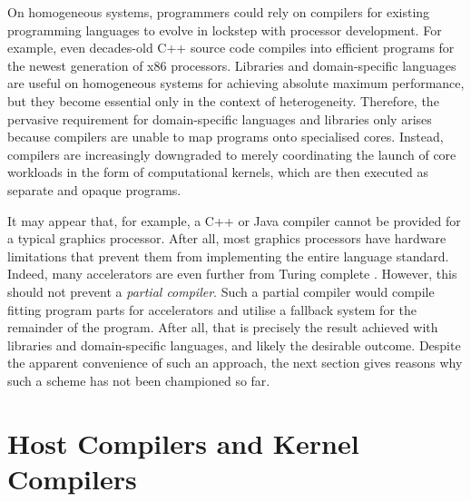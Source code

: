     On homogeneous systems, programmers could rely on compilers for existing
    programming languages to evolve in lockstep with processor development.
    For example, even decades-old C++ source code compiles into efficient
    programs for the newest generation of x86 processors.
    Libraries and domain-specific languages are useful on homogeneous systems
    for achieving absolute maximum performance, but they become essential only
    in the context of heterogeneity.
    Therefore, the pervasive requirement for domain-specific languages and
    libraries only arises because compilers are unable to map programs onto
    specialised cores.
    Instead, compilers are increasingly downgraded to merely coordinating the
    launch of core workloads in the form of computational kernels, which are
    then executed as separate and opaque programs.

    It may appear that, for example, a C++ or Java compiler cannot
    be provided for a typical graphics processor.
    After all, most graphics processors have hardware limitations that prevent
    them from implementing the entire language standard.
    Indeed, many accelerators are even further from Turing complete
    \citep{jouppi2017datacenter}.
    However, this should not prevent a {\it partial compiler}.
    Such a partial compiler would compile fitting program parts for accelerators
    and utilise a fallback system for the remainder of the program.
    After all, that is precisely the result achieved with libraries and
    domain-specific languages, and likely the desirable outcome.
    Despite the apparent convenience of such an approach, the next section gives
    reasons why such a scheme has not been championed so far.

\section{Host Compilers and Kernel Compilers}
\label{sec:hostkernel}

